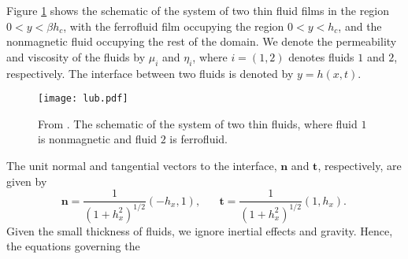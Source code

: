 Figure \ref{fig:lub} shows the schematic of the system of two thin fluid
films in the region $ 0 < y < \beta h_c $, with the ferrofluid film occupying the region $ 0 < y < h_c $, 
and the nonmagnetic fluid occupying the rest of the domain.  We denote the permeability and viscosity of the 
fluids by $\mu_i$ and $\eta_i$, where $i=(1,2)$ denotes fluids $1$ and $2$, respectively. The interface between
two fluids is denoted by $y=h(x, t)$.   
\begin{figure}
  \centerline{\texttt{[image: lub.pdf]}}
  \caption{From \cite{Seric2014}. The schematic of the system of two thin fluids, where fluid $1$ is nonmagnetic and fluid $2$ is ferrofluid.}
\label{fig:lub}
\end{figure}
The unit normal and tangential vectors to the interface, $\textbf{n}$ and $\textbf{t}$, respectively, are given by
\begin{equation}
\textbf{n} = \frac{1}{\left(1+h_x^2\right)^{1/2}}\left( - h_x, 1\right) ,\,\,\,\,\,\,\,\,\,\, \textbf{t} = \frac{1}{\left(1+h_x^2\right)^{1/2}}\left(1, h_x\right).   \, \nonumber
\end{equation}
Given the small thickness of fluids, we ignore inertial effects and gravity. Hence, the equations governing the 
